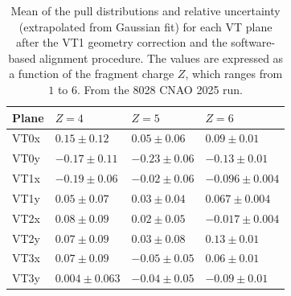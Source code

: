 \begin{table}[H]
{\begin{tabular}{M{1.8cm} M{2.6cm} M{2.6cm} M{2.6cm}}
			\hline\hline
			\textbf{Plane} & \textbf{$Z=4$} & \textbf{$Z=5$} & \textbf{$Z=6$} \\
			\hline
			VT0x & $0.15 \pm 0.12$  & $0.05 \pm 0.06$  & $0.09 \pm 0.01$  \\
			VT0y & $-0.17 \pm 0.11$ & $-0.23 \pm 0.06$ & $-0.13 \pm 0.01$ \\
			VT1x & $-0.19 \pm 0.06$ & $-0.02 \pm 0.06$ & $-0.096 \pm 0.004$ \\
			VT1y & $0.05 \pm 0.07$  & $0.03 \pm 0.04$  & $0.067 \pm 0.004$  \\
			VT2x & $0.08 \pm 0.09$  & $0.02 \pm 0.05$  & $-0.017 \pm 0.004$ \\
			VT2y & $0.07 \pm 0.09$  & $0.03 \pm 0.08$  & $0.13 \pm 0.01$  \\
			VT3x & $0.07 \pm 0.09$  & $-0.05 \pm 0.05$ & $0.06 \pm 0.01$  \\
			VT3y & $0.004 \pm 0.063$ & $-0.04 \pm 0.05$ & $-0.09 \pm 0.01$ \\
			\hline
	\end{tabular}}
	\caption[VT pull means by fragment charge after the VT1 geometry correction and the software-based alignment procedure]{Mean of the pull distributions and relative uncertainty (extrapolated from Gaussian fit) for each VT plane after the VT1 geometry correction and the software-based alignment procedure. The values are expressed as a function of the fragment charge $Z$, which ranges from $1$ to $6$. From the 8028 CNAO 2025 run.}
	\label{tab:vt_pull_means}
\end{table}
